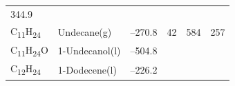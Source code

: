 \documentclass[
]{book}
\theoremstyle{definition}
\theoremstyle{definition}
\theoremstyle{definition}
\theoremstyle{remark}
\begin{document}
\begin{longtable}[]{@{}llllll@{}}
\begin{minipage}[t]{0.14\columnwidth}
344.9\strut
\end{minipage}\tabularnewline
\begin{minipage}[t]{0.07\columnwidth}\raggedright
C\textsubscript{11}H\textsubscript{24}\strut
\end{minipage} & \begin{minipage}[t]{0.17\columnwidth}\raggedright
Undecane(g)\strut
\end{minipage} & \begin{minipage}[t]{0.15\columnwidth}\raggedright
--270.8\strut
\end{minipage} & \begin{minipage}[t]{0.15\columnwidth}\raggedright
42\strut
\end{minipage} & \begin{minipage}[t]{0.14\columnwidth}\raggedright
584\strut
\end{minipage} & \begin{minipage}[t]{0.14\columnwidth}\raggedright
257\strut
\end{minipage}\tabularnewline
\begin{minipage}[t]{0.07\columnwidth}\raggedright
C\textsubscript{11}H\textsubscript{24}O\strut
\end{minipage} & \begin{minipage}[t]{0.17\columnwidth}\raggedright
1-Undecanol(l)\strut
\end{minipage} & \begin{minipage}[t]{0.15\columnwidth}\raggedright
--504.8\strut
\end{minipage} & \begin{minipage}[t]{0.15\columnwidth}\raggedright
\strut
\end{minipage} & \begin{minipage}[t]{0.14\columnwidth}\raggedright
\strut
\end{minipage} & \begin{minipage}[t]{0.14\columnwidth}\raggedright
\strut
\end{minipage}\tabularnewline
\begin{minipage}[t]{0.07\columnwidth}\raggedright
C\textsubscript{12}H\textsubscript{24}\strut
\end{minipage} & \begin{minipage}[t]{0.17\columnwidth}\raggedright
1-Dodecene(l)\strut
\end{minipage} & \begin{minipage}[t]{0.15\columnwidth}\raggedright
--226.2\strut
\end{minipage} & \begin{minipage}[t]{0.15\columnwidth}\raggedright

\end{minipage}
\end{longtable}
\end{document}
